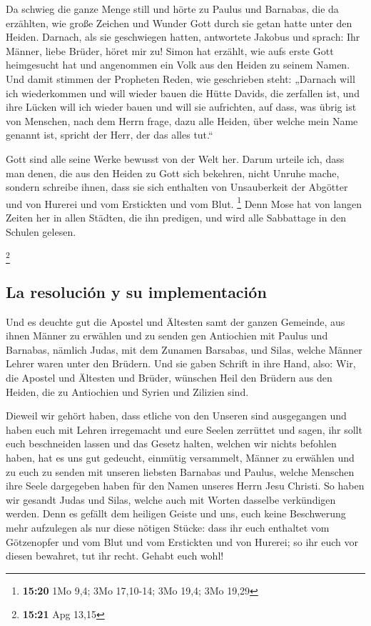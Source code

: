  Da schwieg die ganze Menge still und hörte zu Paulus und
Barnabas, die da erzählten, wie große Zeichen und Wunder Gott durch sie
getan hatte unter den Heiden.  Darnach, als sie
geschwiegen hatten, antwortete Jakobus und sprach: Ihr Männer, liebe
Brüder, höret mir zu!  Simon hat erzählt, wie aufs erste
Gott heimgesucht hat und angenommen ein Volk aus den Heiden zu seinem
Namen.  Und damit stimmen der Propheten Reden, wie
geschrieben steht:  „Darnach will ich wiederkommen und
will wieder bauen die Hütte Davids, die zerfallen ist, und ihre Lücken
will ich wieder bauen und will sie aufrichten,  auf dass,
was übrig ist von Menschen, nach dem Herrn frage, dazu alle Heiden, über
welche mein Name genannt ist, spricht der Herr, der das alles tut.``

 Gott sind alle seine Werke bewusst von der Welt her.
 Darum urteile ich, dass man denen, die aus den Heiden zu
Gott sich bekehren, nicht Unruhe mache,  sondern schreibe
ihnen, dass sie sich enthalten von Unsauberkeit der Abgötter und von
Hurerei und vom Erstickten und vom Blut. \footnote{\textbf{15:20} 1Mo
  9,4; 3Mo 17,10-14; 3Mo 19,4; 3Mo 19,29}  Denn Mose hat
von langen Zeiten her in allen Städten, die ihn predigen, und wird alle
Sabbattage in den Schulen gelesen.

\footnote{\textbf{15:21} Apg 13,15}

\hypertarget{la-resoluciuxf3n-y-su-implementaciuxf3n}{%
\subsection{La resolución y su
implementación}\label{la-resoluciuxf3n-y-su-implementaciuxf3n}}

 Und es deuchte gut die Apostel und Ältesten samt der
ganzen Gemeinde, aus ihnen Männer zu erwählen und zu senden gen
Antiochien mit Paulus und Barnabas, nämlich Judas, mit dem Zunamen
Barsabas, und Silas, welche Männer Lehrer waren unter den Brüdern.
 Und sie gaben Schrift in ihre Hand, also: Wir, die
Apostel und Ältesten und Brüder, wünschen Heil den Brüdern aus den
Heiden, die zu Antiochien und Syrien und Zilizien sind.

 Dieweil wir gehört haben, dass etliche von den Unseren
sind ausgegangen und haben euch mit Lehren irregemacht und eure Seelen
zerrüttet und sagen, ihr sollt euch beschneiden lassen und das Gesetz
halten, welchen wir nichts befohlen haben,  hat es uns
gut gedeucht, einmütig versammelt, Männer zu erwählen und zu euch zu
senden mit unseren liebsten Barnabas und Paulus,  welche
Menschen ihre Seele dargegeben haben für den Namen unseres Herrn Jesu
Christi.  So haben wir gesandt Judas und Silas, welche
auch mit Worten dasselbe verkündigen werden.  Denn es
gefällt dem heiligen Geiste und uns, euch keine Beschwerung mehr
aufzulegen als nur diese nötigen Stücke:  dass ihr euch
enthaltet vom Götzenopfer und vom Blut und vom Erstickten und von
Hurerei; so ihr euch vor diesen bewahret, tut ihr recht. Gehabt euch
wohl!

